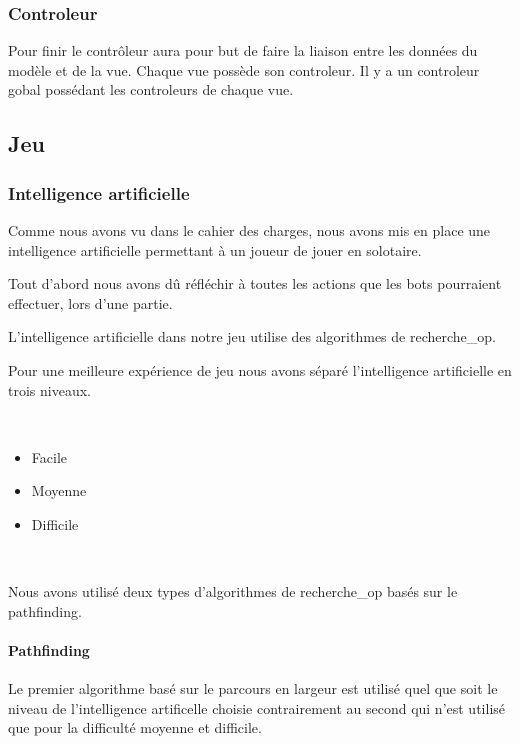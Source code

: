 	\subsubsection*{Controleur}
		
		Pour finir le contrôleur aura pour but de faire la liaison entre les 
		données du modèle et de la vue.
		Chaque vue possède son controleur.
		Il y a un controleur gobal possédant les controleurs de chaque vue.
			

\subsection{Jeu}
	\subsubsection{Intelligence artificielle}
	
		Comme nous avons vu dans le cahier des charges, nous avons mis en 
		place une intelligence artificielle permettant à un joueur de jouer 
		en solotaire.
	
		Tout d'abord nous avons dû réfléchir à toutes les actions que les 
		\glspl{bot} pourraient effectuer, lors d'une partie.
		
		L'intelligence artificielle dans notre jeu utilise des algorithmes de \gls{recherche_op}.
		
		Pour une meilleure expérience de jeu nous avons séparé l'intelligence artificielle en trois niveaux.
		
		$\,$
		
		\begin{itemize}
		  \item Facile
		  \item Moyenne
		  \item Difficile
		\end{itemize}
		
		$\,$
		
		Nous avons utilisé deux types d'algorithmes de \gls{recherche_op} basés sur le \gls{pathfinding}.
		
		\paragraph{Pathfinding}
		
			Le premier algorithme basé sur le parcours en largeur est utilisé quel que soit
			le niveau de l'intelligence artificelle choisie contrairement au second qui n'est utilisé
			que pour la difficulté moyenne et difficile.
		
